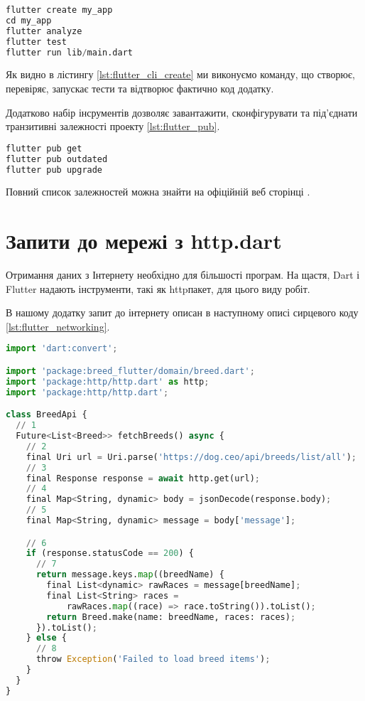 \begin{lstlisting}[style=light, language=Python,label={lst:flutter_cli_create},caption=Flutter Create Project]
flutter create my_app
cd my_app
flutter analyze
flutter test
flutter run lib/main.dart
\end{lstlisting}

Як видно в лістингу \ref{lst:flutter_cli_create} ми виконуємо команду, що створює, перевіряє, запускає тести та відтворює фактично код додатку.

Додатково набір інсрументів дозволяє завантажити, сконфігурувати та під'єднати транзитивні залежності проекту \ref{lst:flutter_pub}.
\begin{lstlisting}[style=light, language=Python,label={lst:flutter_pub},caption=Flutter Dependency Resolution]
flutter pub get
flutter pub outdated
flutter pub upgrade
\end{lstlisting}

Повний список залежностей можна знайти на офіційній веб сторінці \cite{flutter_cli}.


\section{Запити до мережі з http.dart}
\label{section.3.3}
Отримання даних з Інтернету необхідно для більшості програм. На щастя, Dart і Flutter надають інструменти, такі як httpпакет, для цього виду робіт.

В нашому додатку запит до інтернету описан в наступному описі сирцевого коду \ref{lst:flutter_networking}.

\begin{lstlisting}[style=light, language=Python,label={lst:flutter_networking},caption=Flutter Networking]
import 'dart:convert';

import 'package:breed_flutter/domain/breed.dart';
import 'package:http/http.dart' as http;
import 'package:http/http.dart';

class BreedApi {
  // 1
  Future<List<Breed>> fetchBreeds() async {
    // 2
    final Uri url = Uri.parse('https://dog.ceo/api/breeds/list/all');
    // 3
    final Response response = await http.get(url);
    // 4
    final Map<String, dynamic> body = jsonDecode(response.body);
    // 5
    final Map<String, dynamic> message = body['message'];

    // 6
    if (response.statusCode == 200) {
      // 7
      return message.keys.map((breedName) {
        final List<dynamic> rawRaces = message[breedName];
        final List<String> races =
            rawRaces.map((race) => race.toString()).toList();
        return Breed.make(name: breedName, races: races);
      }).toList();
    } else {
      // 8
      throw Exception('Failed to load breed items');
    }
  }
}
\end{lstlisting}

